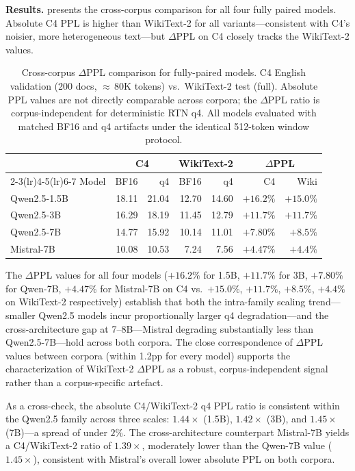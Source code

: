 \documentclass[10pt,twocolumn]{article}
\newcommand{\CCTOKENS}{80}             %
\newcommand{\COBFL}{18.11}             %
\newcommand{\COBQU}{21.04}             %
\newcommand{\COBDP}{$+16.2\%$}         %
\newcommand{\CTHFL}{16.29}             %
\newcommand{\CTHQU}{18.19}             %
\newcommand{\CTHDP}{$+11.7\%$}         %
\newcommand{\CSVFL}{14.77}             %
\newcommand{\CSVQU}{15.92}             %
\newcommand{\CSVDP}{$+7.80\%$}         %
\newcommand{\MSBFL}{10.08}             %
\newcommand{\MSQU}{10.53}              %
\newcommand{\MSDP}{$+4.47\%$}          %
\begin{document}
\textbf{Results.}   presents the cross-corpus comparison for all
four fully paired models. Absolute C4 PPL is higher than WikiText-2 for all
variants---consistent with C4's noisier, more heterogeneous text---but
$\Delta$PPL on C4 closely tracks the WikiText-2 values.

\begin{table}[t]
  \centering
  \caption{Cross-corpus $\Delta$PPL comparison for fully-paired models.
    C4 English validation (200 docs, $\approx$\,\CCTOKENS{}K tokens)
    vs.\ WikiText-2 test (full).  Absolute PPL values are not directly
    comparable across corpora; the $\Delta$PPL ratio is corpus-independent
    for deterministic RTN q4.  All models evaluated with matched BF16 and
    q4 artifacts under the identical 512-token window protocol.}
  \label{tab:c4}
  \begin{tabular}{lrrrrrr}
    \toprule
    & \multicolumn{2}{c}{C4} & \multicolumn{2}{c}{WikiText-2} & \multicolumn{2}{c}{$\Delta$PPL} \\
    \cmidrule(lr){2-3}\cmidrule(lr){4-5}\cmidrule(lr){6-7}
    Model & BF16 & q4 & BF16 & q4 & C4 & Wiki \\
    \midrule
    Qwen2.5-1.5B & \COBFL{} & \COBQU{} & 12.70 & 14.60 & \COBDP{} & $+15.0\%$ \\
    Qwen2.5-3B   & \CTHFL{} & \CTHQU{} & 11.45 & 12.79 & \CTHDP{} & $+11.7\%$ \\
    Qwen2.5-7B   & \CSVFL{} & \CSVQU{} & 10.14 & 11.01 & \CSVDP{} & $+8.5\%$ \\
    Mistral-7B   & \MSBFL{} & \MSQU{}  &  7.24 &  7.56 & \MSDP{}  & $+4.4\%$ \\
    \bottomrule
  \end{tabular}
\end{table}

The $\Delta$PPL values for all four models (\COBDP{} for 1.5B, \CTHDP{} for
3B, \CSVDP{} for Qwen-7B, \MSDP{} for Mistral-7B on C4 vs.\ $+15.0\%$,
$+11.7\%$, $+8.5\%$, $+4.4\%$ on WikiText-2 respectively) establish that
both the intra-family scaling trend---smaller Qwen2.5 models incur
proportionally larger q4 degradation---and the cross-architecture gap at
7--8B---Mistral degrading substantially less than Qwen2.5-7B---hold across
both corpora.  The close correspondence of $\Delta$PPL values between
corpora (within 1.2pp for every model) supports the characterization of
WikiText-2 $\Delta$PPL as a robust, corpus-independent signal rather than a
corpus-specific artefact.

As a cross-check, the absolute C4/WikiText-2 q4 PPL ratio is consistent
within the Qwen2.5 family across three scales: $1.44\times$ (1.5B),
$1.42\times$ (3B), and $1.45\times$ (7B)---a spread of under $2\%$.  The
cross-architecture counterpart Mistral-7B yields a C4/WikiText-2 ratio of
$1.39\times$, moderately lower than the Qwen-7B value ($1.45\times$),
consistent with Mistral's overall lower absolute PPL on both corpora.
\end{document}
